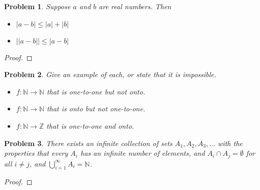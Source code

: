\documentclass[12pt]{article}
\newtheorem{problem}{Problem}
\newcommand{\NN}{\ensuremath{\mathbb N}}
\newcommand{\ZZ}{\ensuremath{\mathbb Z}}
\begin{document}
\begin{problem} %
Suppose $a$ and $b$ are real numbers.  Then
\begin{itemize}
\item[(a)] $|a-b| \le |a|+|b|$
\item[(b)] $\big||a-b|\big| \le |a-b|$
\end{itemize}
\end{problem}


\begin{proof}
%
\end{proof}


\begin{problem} %
Give an example of each, or state that it is impossible.
\begin{itemize}
\item[(a)] $f:\NN\to\NN$ that is one-to-one but not onto.

\item[(b)] $f:\NN\to\NN$ that is onto but not one-to-one.

\item[(d)] $f:\NN\to\ZZ$ that is one-to-one and onto.

\end{itemize}
\end{problem}



\begin{problem} %
There exists an infinite collection of sets $A_1,A_2,A_3,\dots$ with the properties that every $A_i$ has an infinite number of elements, and $A_i\cap A_j=\emptyset$ for all $i\ne j$, and $\bigcup_{i=1}^\infty A_i=\NN$. \end{problem}

\begin{proof}
\end{proof}
\end{document}
